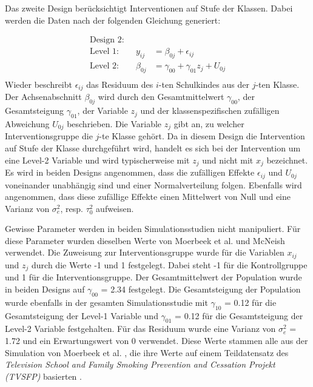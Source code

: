 \documentclass[12pt]{article}\usepackage[]{graphicx}\usepackage[]{color}
\begin{document}
Das zweite Design berücksichtigt Interventionen auf Stufe der Klassen. Dabei werden die Daten nach der folgenden Gleichung generiert:

\begin{equation} 
\begin{split}
 \text{Design 2:}\\
  \text{Level 1:}  \qquad y_{ij} & = \beta_{0j} + \epsilon_{ij}\\
 \text{Level 2:} \qquad \beta_{0j} & = \gamma_{00} + \gamma_{01}z_{j} + U_{0j}\\
\end{split}	
\end{equation} 
Wieder beschreibt $\epsilon_{ij}$ das Residuum des $i$-ten Schulkindes aus der $j$-ten Klasse. Der Achsenabschnitt $\beta_{0j}$ wird durch den Gesamtmittelwert $\gamma_{00}$, der Gesamtsteigung $\gamma_{01}$, der Variable $z_{j}$ und der klassenspezifischen zufälligen Abweichung $U_{0j}$ beschrieben. Die Variable $z_{j}$ gibt an, zu welcher Interventionsgruppe die $j$-te Klasse gehört. Da in diesem Design die Intervention auf Stufe der Klasse durchgeführt wird, handelt es sich bei der Intervention um eine Level-2 Variable und wird typischerweise mit $z_{j}$ und nicht mit $x_{j}$ bezeichnet. Es wird in beiden Designs angenommen, dass die zufälligen Effekte $\epsilon_{ij}$ und $U_{0j}$ voneinander unabhängig sind und einer Normalverteilung folgen. Ebenfalls wird angenommen, dass diese zufällige Effekte einen Mittelwert von Null und eine Varianz von $\sigma^{2}_{e}$, resp. $\tau^{2}_{0}$ aufweisen.

Gewisse Parameter werden in beiden Simulationsstudien nicht manipuliert. Für diese Parameter wurden dieselben Werte von Moerbeek et al. \citeyearpar{MOERBEEK2003341} und McNeish \citeyearpar{mcneish2014analyzing} verwendet. Die Zuweisung zur Interventionsgruppe wurde für die Variablen $x_{ij}$ und $z_{j}$ durch die Werte -1 und 1 festgelegt. Dabei steht -1 für die Kontrollgruppe und 1 für die Interventionsgruppe. Der Gesamtmittelwert der Population wurde in beiden Designs auf $\gamma_{00}$ = 2.34 festgelegt. Die Gesamtsteigung der Population wurde ebenfalls in der gesamten Simulationsstudie mit $\gamma_{10}$ = 0.12 für die Gesamtsteigung der Level-1 Variable und $\gamma_{01}$ = 0.12 für die Gesamtsteigung der Level-2 Variable festgehalten. Für das Residuum wurde eine Varianz von $\sigma^{2}_{e}$ = 1.72 und ein Erwartungswert von 0 verwendet. Diese Werte stammen alle aus der Simulation von Moerbeek et al. \citeyearpar{MOERBEEK2003341}, die ihre Werte auf einem Teildatensatz des \textit{Television School and Family Smoking Prevention and Cessation Projekt (TVSFP)} basierten \citep{FLAY1995smoking}.
\end{document}
